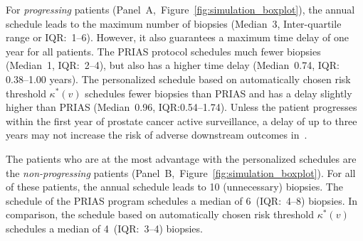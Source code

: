 For \textit{progressing} patients (Panel~A,~Figure~\ref{fig:simulation_boxplot}), the annual schedule leads to the maximum number of biopsies (Median~3, Inter-quartile range or IQR:~1--6). However, it also guarantees a maximum time delay of one year for all patients. The PRIAS protocol schedules much fewer biopsies (Median~1, IQR:~2--4), but also has a higher time delay (Median~0.74, IQR: 0.38--1.00 years). The personalized schedule based on automatically chosen risk threshold $\kappa^*(v)$ schedules fewer biopsies than PRIAS and has a delay slightly higher than PRIAS (Median~0.96, IQR:0.54--1.74). Unless the patient progresses within the first year of prostate cancer active surveillance, a delay of up to three years may not increase the risk of adverse downstream outcomes in~\citep{inoue2018comparative,carvalho}. 

The patients who are at the most advantage with the personalized schedules are the \textit{non-progressing} patients (Panel~B,~Figure~\ref{fig:simulation_boxplot}). For all of these patients, the annual schedule leads to 10 (unnecessary) biopsies. The schedule of the PRIAS program schedules a median of 6~(IQR:~4--8) biopsies. In comparison, the schedule based on automatically chosen risk threshold $\kappa^*(v)$ schedules a median of 4~(IQR:~3--4) biopsies.

